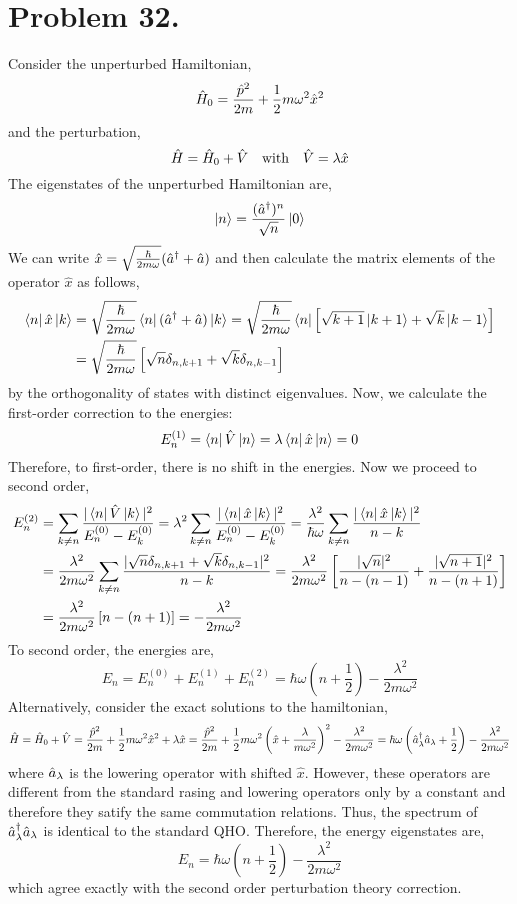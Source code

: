 \documentclass[12pt]{extarticle}
\begin{document}
 
\section*{Problem 32.}
Consider the unperturbed Hamiltonian,
\[\hat{H}_0 = \frac{\hat{p}^2}{2m} + \frac{1}{2} m \omega^2 \hat{x}^2 \]
and the perturbation,
\[\hat{H} = \hat{H}_0 + \hat{V} \quad \text{with} \quad \hat{V} = \lambda  \hat{x}\]
The eigenstates of the unperturbed Hamiltonian are, 
\[\left| n \right> = \frac{(\hat{a}^\dagger)^n}{\sqrt{n}} \left| 0 \right>\]
We can write $\hat{x} = \sqrt{\frac{\hbar}{2 m \omega}} (\hat{a}^\dagger + \hat{a})$ and then calculate the matrix elements of the operator $\hat{x}$ as follows,
\begin{align*}
\left< n \right| \hat{x} \left| k \right> &= \sqrt{\frac{\hbar}{2 m \omega}} \left< n \right| (\hat{a}^\dagger + \hat{a}) \left| k \right> = \sqrt{\frac{\hbar}{2 m \omega}} \left< n \right| \left[ \sqrt{k + 1} \left| k + 1 \right> + \sqrt{k} \left| k - 1 \right> \right] \\ &= \sqrt{\frac{\hbar}{2 m \omega}} \left[\sqrt{n} \delta_{n, k+1} + \sqrt{k} \delta_{n, k-1} \right]
\end{align*}
by the orthogonality of states with distinct eigenvalues.
Now, we calculate the first-order correction to the energies:
\[ E^{(1)}_n = \left< n \right| \hat{V} \left| n \right> = \lambda  \left< n \right| \hat{x} \left| n \right> = 0 \]
Therefore, to first-order, there is no shift in the energies. Now we proceed to second order, 
\begin{align*}
E^{(2)}_n & = \sum_{k \neq n} \frac{|\left< n \right| \hat{V} \left| k \right>|^2}{E^{(0)}_n - E^{(0)}_k} = \lambda^2 \sum_{k \neq n} \frac{|\left< n \right| \hat{x} \left| k \right>|^2}{E^{(0)}_n - E^{(0)}_k} = \frac{\lambda^2}{\hbar \omega} \sum_{k \neq n} \frac{|\left< n \right| \hat{x} \left| k \right>|^2}{n - k} \\
& = \frac{\lambda^2}{2m \omega^2} \sum_{k \neq n} \frac{|\sqrt{n} \delta_{n, k+1} + \sqrt{k} \delta_{n, k-1}|^2}{n - k} = \frac{\lambda^2}{2m\omega^2} \left[\frac{|\sqrt{n}|^2}{n - (n - 1)} + \frac{|\sqrt{n + 1}|^2}{n - (n + 1)} \right] \\
& = \frac{\lambda^2}{2m \omega^2} \left[n - (n + 1) \right] = - \frac{\lambda^2}{2m \omega^2}
\end{align*} 
To second order, the energies are,
\[E_n = E^{(0)}_n + E^{(1)}_n + E^{(2)}_n = \hbar \omega \left(n + \frac{1}{2}\right) - \frac{\lambda^2}{2m \omega^2}\]
Alternatively, consider the exact solutions to the hamiltonian,
\[\hat{H} = \hat{H}_0 + \hat{V} = \frac{\hat{p}^2}{2m} + \frac{1}{2} m \omega^2 \hat{x}^2 + \lambda \hat{x} = \frac{\hat{p}^2}{2m} + \frac{1}{2} m \omega^2 \left(\hat{x} + \frac{\lambda}{m \omega^2} \right)^2 -  \frac{\lambda^2}{2 m \omega^2} = \hbar \omega \left( \hat{a}^\dagger_\lambda \hat{a}_\lambda + \frac{1}{2} \right) - \frac{\lambda^2}{2 m \omega^2} \] 
where $\hat{a}_{\lambda}$ is the lowering operator with shifted $\hat{x}$. However, these operators are different from the standard rasing and lowering operators only by a constant and therefore they satify the same commutation relations. Thus, the spectrum of $\hat{a}^\dagger_\lambda \hat{a}_\lambda$ is identical to the standard QHO. Therefore, the energy eigenstates are,
\[E_n = \hbar \omega \left(n + \frac{1}{2} \right) - \frac{\lambda^2}{2 m \omega^2}\]
which agree exactly with the second order perturbation theory correction. 
\end{document}
